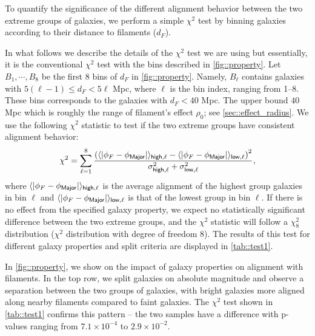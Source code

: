 \documentclass[usenatbib,useAMS]{mnras}
\theoremstyle{remark}
\begin{document}
{To quantify the significance of the different alignment behavior between the two extreme groups of galaxies,
we perform a simple $\chi^2$ test by binning galaxies according to their
distance to filaments ($d_F$).
{{In what follows we describe the details of the $\chi^2$ test we are using but essentially, 
it is the conventional $\chi^2$ test with the bins described in \autoref{fig::property}.}
Let $B_1,\cdots,B_8$ be the first $8$ bins of $d_F$ in
\autoref{fig::property}. 
Namely, $B_\ell$ contains galaxies with $5(\ell-1)\leq d_F<5\ell$ Mpc, where $\ell$ is the bin
index, ranging from 1--8.
These bins corresponds to the galaxies with $d_F<40$ Mpc. 
The upper bound $40$ Mpc which is roughly the range of filament's effect $\rho_0$; see \autoref{sec::effect_radius}. 
We use the following $\chi^2$ statistic to test if the two extreme groups have consistent alignment behavior:
\begin{equation}
\chi^2 = \sum_{\ell=1}^8 \frac{\left(\langle|\phi_F-\phi_{\sf Major}|\rangle_{\sf high,\ell}-\langle|\phi_F-\phi_{\sf Major}|\rangle_{\sf low,\ell}\right)^2}{\sigma^2_{\sf high,\ell}+\sigma^2_{\sf low,\ell}},
\end{equation}
where $\langle|\phi_F-\phi_{\sf Major}|\rangle_{\sf high,\ell}$ is the average alignment
of the highest group galaxies in bin $\ell$ and $\langle|\phi_F-\phi_{\sf Major}|\rangle_{\sf low,\ell}$
is that of the lowest group in bin $\ell$.
If there is no effect from the specified galaxy property, 
we expect no statistically significant difference between the two extreme groups,
and the
$\chi^2$ statistic will follow a $\chi^2_8$ distribution ($\chi^2$ distribution with degree of freedom $8$).
The results of this test for different galaxy properties and split criteria are displayed in \autoref{tab::test1}.

In \autoref{fig::property}, we show on the impact of galaxy properties on alignment with filaments.
In the top row, we split galaxies on absolute magnitude and observe a separation between the two groups of galaxies, with bright galaxies more aligned along nearby filaments compared to faint galaxies. The $\chi^2$ test shown in \autoref{tab::test1} confirms this pattern -- the two samples have a difference with p-values ranging
from $7.1\times10^{-4}$ to $2.9\times 10^{-2}$.

}}
\end{document}
